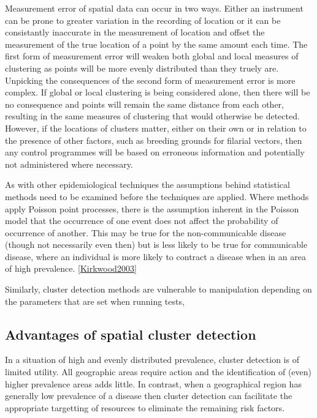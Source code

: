 \documentclass[11pt,a4paper]{article}
\begin{document}
Measurement error of spatial data can occur in two ways. 
Either an instrument can be prone to greater variation in the recording of location or it can be consistantly inaccurate in the measurement of location and offset the measurement of the true location of a point by the same amount each time. 
The first form of measurement error will weaken both global and local measures of clustering as points will be more evenly distributed than they truely are. 
Unpicking the consequences of the second form of measurement error is more complex. 
If global or local clustering is being considered alone, then there will be no consequence and points will remain the same distance from each other, resulting in the same measures of clustering that would otherwise be detected.
However, if the locations of clusters matter, either on their own or in relation to the presence of other factors, such as breeding grounds for filarial vectors, then any control programmes will be based on erroneous information and potentially not administered where necessary. 

As with other epidemiological techniques the assumptions behind statistical methods need to be examined before the techniques are applied. 
Where methods apply Poisson point processes, there is the assumption inherent in the Poisson model that the occurrence of one event does not affect the probability of occurrence of another. 
This may be true for the non-communicable disease (though not necessarily even then) but is less likely to be true for communicable disease, where an individual is more likely to contract a disease when in an area of high prevalence. \ref{Kirkwood2003}

Similarly, cluster detection methods are vulnerable to manipulation depending on the parameters that are set when running tests, 

\subsection{Advantages of spatial cluster detection}
In a situation of high and evenly distributed prevalence, cluster detection is of limited utility.
All geographic areas require action and the identification of (even) higher prevalence areas adds little.
In contrast, when a geographical region has generally low prevalence of a disease then cluster detection can facilitate the appropriate targetting of resources to eliminate the remaining risk factors. 
\end{document}
